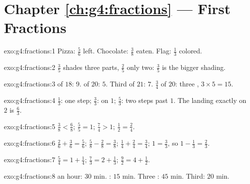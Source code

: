 \section*{Chapter \ref{ch:g4:fractions} --- First Fractions}

\begin{solution}{exo:g4:fractions:1}
Pizza: $\frac56$ left. Chocolate: $\frac38$ eaten. Flag: $\frac13$
colored.
\end{solution}

\begin{solution}{exo:g4:fractions:2}
$\frac35$ shades three parts, $\frac25$ only two: $\frac35$ is the
bigger shading.
\end{solution}

\begin{solution}{exo:g4:fractions:3}
 of $18$: $9$.  of $20$: $5$. Third of $21$: $7$.
$\frac34$ of $20$: three , $3 \times 5 = 15$.
\end{solution}

\begin{solution}{exo:g4:fractions:4}
$\frac13$: one step; $\frac33$: on $1$; $\frac53$: two steps past
$1$. The  landing exactly on $2$ is $\frac63$.
\end{solution}

\begin{solution}{exo:g4:fractions:5}
$\frac38 < \frac68$; \quad $\frac55 = 1$; \quad $\frac74 > 1$;
\quad $\frac12 = \frac24$.
\end{solution}

\begin{solution}{exo:g4:fractions:6}
$\frac26 + \frac36 = \frac56$; \quad
$\frac58 - \frac28 = \frac38$; \quad
$\frac14 + \frac24 = \frac34$; \quad
$1 = \frac33$, so $1 - \frac13 = \frac23$.
\end{solution}

\begin{solution}{exo:g4:fractions:7}
$\frac54 = 1 + \frac14$; \quad
$\frac73 = 2 + \frac13$; \quad
$\frac92 = 4 + \frac12$.
\end{solution}

\begin{solution}{exo:g4:fractions:8}
 an hour: $30$ min. : $15$ min. Three : $45$
min. Third: $20$ min.
\end{solution}

